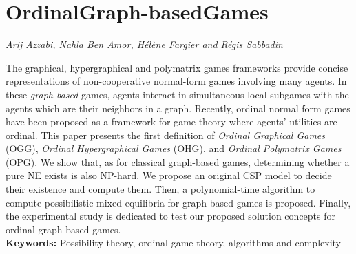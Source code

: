 \documentclass[../booklet.tex]{subfiles}
\begin{document}
\section[OrdinalGraph-basedGames. {\it Arij Azzabi, Nahla Ben Amor, Hélène Fargier and Régis Sabbadin}]{OrdinalGraph-basedGames}
   

\begin{center}
  {\it Arij Azzabi, Nahla Ben Amor, Hélène Fargier and Régis Sabbadin}
\end{center}

\vskip 0.8cm

 
 The graphical, hypergraphical and polymatrix games frameworks provide concise representations of non-cooperative normal-form games involving many agents. In these {\em graph-based} games, agents interact in simultaneous local subgames with the agents which are their neighbors in a graph. 
Recently, ordinal normal form games have been proposed as a framework for game theory where agents' utilities are ordinal. 
This paper presents the first definition of \emph{Ordinal Graphical Games} (OGG),  \emph{Ordinal Hypergraphical Games} (OHG), and \emph{Ordinal Polymatrix Games} (OPG). 
We show that, as for classical graph-based games, determining whether a pure NE exists is also NP-hard. We propose an original CSP model to decide their existence and compute them.
Then, a polynomial-time algorithm to compute possibilistic mixed equilibria for graph-based games is proposed. Finally, the experimental study is dedicated to test our proposed solution concepts for ordinal graph-based games.\\
{\bf Keywords:} Possibility theory, ordinal game theory, algorithms and complexity 
\end{document}
